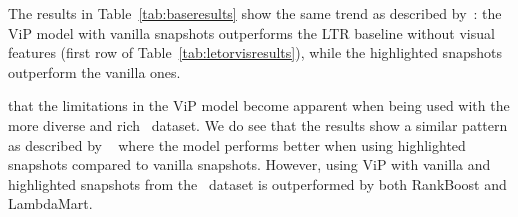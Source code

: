 The results in Table~\ref{tab:baseresults} show the same trend as described by~\citet{fan2017learning}:
the ViP model with vanilla snapshots outperforms the \ac{LTR} baseline without visual features (first row of Table~\ref{tab:letorvisresults}),
while the highlighted snapshots outperform the vanilla ones.

that the limitations in the ViP model become apparent when being used with the more diverse and rich \datasetname~dataset. We do see that the results show a similar pattern as described by ~\citet{fan2017learning} where the model performs better when using highlighted snapshots compared to vanilla snapshots. However, using ViP with vanilla and highlighted snapshots from the \datasetname~dataset is outperformed by both RankBoost and LambdaMart. 
\fi




